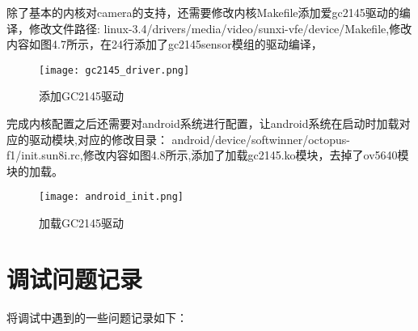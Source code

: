 除了基本的内核对camera的支持，还需要修改内核Makefile添加爱gc2145驱动的编译，修改文件路径:
linux-3.4/drivers/media/video/sunxi-vfe/device/Makefile,修改内容如图4.7所示，在24行添加了gc2145sensor模组的驱动编译，
\begin{figure}[H]
\centering
\texttt{[image: gc2145\_driver.png]}
\caption{添加GC2145驱动\label{figur:gc2145_driver}}
\end{figure}

完成内核配置之后还需要对android系统进行配置，让android系统在启动时加载对应的驱动模块,对应的修改目录：
android/device/softwinner/octopus-f1/init.sun8i.rc,修改内容如图4.8所示,添加了加载gc2145.ko模块，去掉了ov5640模块的加载。
\begin{figure}[H]
\centering
\texttt{[image: android\_init.png]}
\caption{加载GC2145驱动\label{figur:android_init}}
\end{figure}

\section{调试问题记录}
将调试中遇到的一些问题记录如下：

